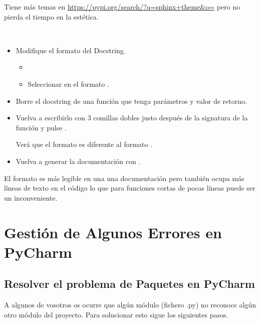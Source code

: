 Tiene más temas en \url{https://pypi.org/search/?q=sphinx+theme&o=} pero no pierda el tiempo en la estética.



\begin{ejercicio}$ $
\begin{itemize}
\item Modifique el formato del Docstring.
	\begin{itemize}
	\item {}
	\item Seleccionar en  el formato .
	\end{itemize}

\item Borre el docstring de una función que tenga parámetros y valor de retorno. 

\item Vuelva a escribirlo con 3  comillas dobles     justo después de la signatura de la función y pulse \keys{\return}.

Verá que el formato  es diferente al formato .

\item Vuelva a generar la documentación con . 
\end{itemize}

El formato   es más legible en una una documentación pero también ocupa más líneas de texto en el código lo que para funciones cortas de pocas líneas puede ser un inconveniente.
\end{ejercicio}





\section{Gestión de Algunos Errores en PyCharm}


\subsection{Resolver el problema de Paquetes en PyCharm}

A algunos de vosotros os ocurre que algún módulo (fichero .py) no reconoce algún otro módulo del proyecto.  Para solucionar esto sigue los siguientes pasos.

